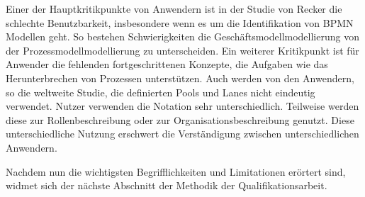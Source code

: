 Einer der Hauptkritikpunkte von Anwendern ist in der Studie von Recker die schlechte Benutzbarkeit, insbesondere wenn es um die Identifikation von BPMN Modellen geht. So bestehen Schwierigkeiten die Geschäftsmodellmodellierung von der Prozessmodellmodellierung zu unterscheiden. Ein weiterer Kritikpunkt ist für Anwender die fehlenden fortgeschrittenen Konzepte, die Aufgaben wie das Herunterbrechen von Prozessen unterstützen. Auch werden von den Anwendern, so die weltweite Studie, die definierten Pools und Lanes nicht eindeutig verwendet. Nutzer verwenden die Notation sehr unterschiedlich. Teilweise werden diese zur Rollenbeschreibung oder zur Organisationsbeschreibung genutzt. Diese unterschiedliche Nutzung erschwert die Verständigung zwischen unterschiedlichen Anwendern.

Nachdem nun die wichtigsten Begrifflichkeiten und Limitationen erörtert sind, widmet sich der nächste Abschnitt der Methodik der Qualifikationsarbeit. 


